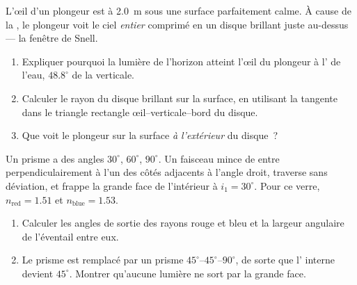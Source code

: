 \begin{exercise}[$\star\star\star$]\label{exo:g10:refraction:12}
L'œil d'un plongeur est à \qty{2.0}{m} sous une surface parfaitement
calme. À cause de la , le plongeur voit le ciel
\emph{entier} comprimé en un disque brillant juste au-dessus --- la
fenêtre de Snell.
\begin{enumerate}
  \item Expliquer pourquoi la lumière de l'horizon atteint l'œil du
        plongeur à l' de l'eau, $48.8^\circ$ de la
        verticale.
  \item Calculer le rayon du disque brillant sur la surface, en
        utilisant la tangente dans le triangle rectangle
        œil--verticale--bord du disque.
  \item Que voit le plongeur sur la surface \emph{à l'extérieur} du
        disque~?
\end{enumerate}
\end{exercise}

\begin{exercise}[$\star\star\star$]\label{exo:g10:refraction:13}
Un prisme a des angles $30^\circ$, $60^\circ$, $90^\circ$. Un faisceau
mince de  entre perpendiculairement à l'un des côtés
adjacents à l'angle droit, traverse sans déviation, et frappe la grande
face de l'intérieur à $i_1 = 30^\circ$. Pour ce verre,
$n_{\text{red}} = 1.51$ et $n_{\text{blue}} = 1.53$.
\begin{enumerate}
  \item Calculer les angles de sortie des rayons rouge et bleu et la
        largeur angulaire de l'éventail entre eux.
  \item Le prisme est remplacé par un prisme $45^\circ$--$45^\circ$--$90^\circ$,
        de sorte que l' interne devient $45^\circ$.
        Montrer qu'aucune lumière ne sort par la grande face.
\end{enumerate}
\end{exercise}

